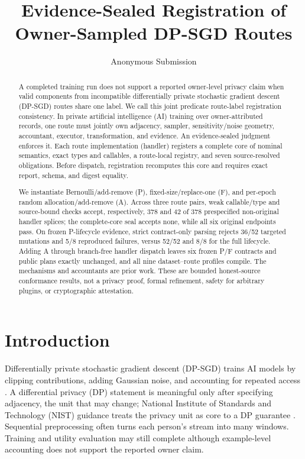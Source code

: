 \documentclass[letterpaper]{article}
\title{Evidence-Sealed Registration of Owner-Sampled DP-SGD Routes}
\author{
Anonymous Submission
}
\begin{document}
\maketitle

\begin{abstract}
A completed training run does not support a reported owner-level privacy claim
when valid components from incompatible differentially private stochastic
gradient descent (DP-SGD) routes share one label.  We call
this joint predicate route-label registration consistency.  In private
artificial intelligence (AI) training over owner-attributed records, one route
must jointly own adjacency, sampler, sensitivity/noise geometry, accountant,
executor, transformation, and evidence.  An evidence-sealed judgment enforces
it.  Each route implementation (handler) registers a complete core of nominal
semantics, exact types and callables, a route-local registry, and seven
source-resolved obligations.  Before dispatch, registration recomputes this
core and requires exact report, schema, and digest equality.

We instantiate Bernoulli/add-remove (P), fixed-size/replace-one (F), and
per-epoch random allocation/add-remove (A).  Across three route pairs, weak callable/type and
source-bound checks accept, respectively, 378 and 42 of 378 prespecified
non-original handler splices; the complete-core seal accepts none, while all
six original endpoints pass.  On frozen P-lifecycle evidence, strict
contract-only parsing rejects
36/52 targeted mutations and 5/8 reproduced failures, versus 52/52 and 8/8 for
the full lifecycle.  Adding A through branch-free handler dispatch leaves six
frozen P/F contracts and public plans exactly unchanged, and all nine
dataset--route profiles compile.  The mechanisms and accountants are prior work.
These are bounded honest-source conformance results, not a privacy proof,
formal refinement, safety for arbitrary plugins, or cryptographic attestation.
\end{abstract}

\section{Introduction}

Differentially private stochastic gradient descent (DP-SGD) trains AI models by
clipping contributions, adding Gaussian noise, and accounting for repeated
access \citep{abadi2016deep,dwork2014foundations,mironov2017renyi}.  A
differential privacy (DP) statement is meaningful only after specifying
adjacency, the unit that may change; National Institute of Standards and
Technology (NIST) guidance treats the privacy unit as core to a DP guarantee
\citep{near2025nist}.  Sequential preprocessing often turns each person's
stream into many windows.  Training and utility evaluation may still complete
although example-level accounting does not support the reported owner claim.
\end{document}
